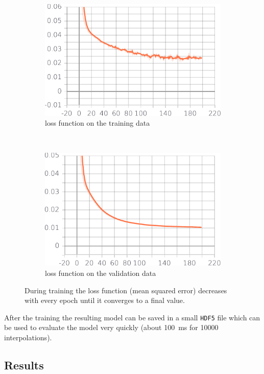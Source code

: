 \begin{figure}[h] %
	\centering
	\begin{subfigure}[t]{0.5\textwidth}
		\centering
		\includegraphics[width=\linewidth]{images/loss.pdf}
		\caption{loss function on the training data}
		\label{fig:loss}
	\end{subfigure}%
	~ 
	\begin{subfigure}[t]{0.5\textwidth}
		\centering
		\includegraphics[width=\linewidth]{images/val_loss.pdf}
		\caption{loss function on the validation data}
		\label{fig:val_loss}
	\end{subfigure}
	\caption{During training the loss function (mean squared error) decreases with every epoch until it converges to a final value.}
	\label{fig:loss_val}
	
\end{figure}

After the training the resulting model can be saved in a small \texttt{HDF5} file which can be used to evaluate the model very quickly (about \SI{100}{\milli\second} for \num{10000} interpolations).


\subsection{Results}
